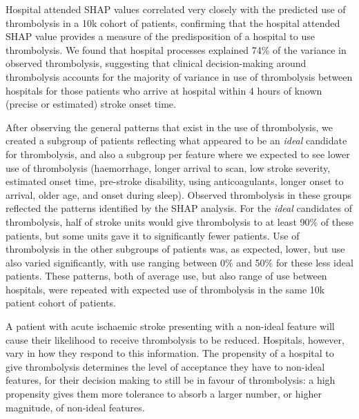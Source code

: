 Hospital attended SHAP values correlated very closely with the predicted use of thrombolysis in a 10k cohort of patients, confirming that the hospital attended SHAP value provides a measure of the predisposition of a hospital to use thrombolysis. We found that hospital processes explained 74\% of the variance in observed thrombolysis, suggesting that clinical decision-making around thrombolysis accounts for the majority of variance in use of thrombolysis between hospitals for those patients who arrive at hospital within 4 hours of known (precise or estimated) stroke onset time. 

After observing the general patterns that exist in the use of thrombolysis, we created a subgroup of patients reflecting what appeared to be an \emph{ideal} candidate for thrombolysis, and also a subgroup per feature where we expected to see lower use of thrombolysis (haemorrhage, longer arrival to scan, low stroke severity, estimated onset time, pre-stroke disability, using anticoagulants, longer onset to arrival, older age, and onset during sleep). Observed thrombolysis in these groups reflected the patterns identified by the SHAP analysis. For the \emph{ideal} candidates of thrombolysis, half of stroke units would give thrombolysis to at least 90\% of these patients, but some units gave it to significantly fewer patients. Use of thrombolysis in the other subgroups of patients was, as expected, lower, but use also varied significantly, with use ranging between 0\% and 50\% for these less ideal patients. These patterns, both of average use, but also range of use between hospitals, were repeated with expected use of thrombolysis in the same 10k patient cohort of patients.

A patient with acute ischaemic stroke presenting with a non-ideal feature will cause their likelihood to receive thrombolysis to be reduced. Hospitals, however, vary in how they respond to this information. The propensity of a hospital to give thrombolysis determines the level of acceptance they have to non-ideal features, for their decision making to still be in favour of thrombolysis: a high propensity gives them more tolerance to absorb a larger number, or higher magnitude, of non-ideal features.

\iffalse
REFERS TO ARTIFICIAL PATIENTS THAT MAY NOT INCLUDE
Another way of showing variation between units was to use artificial patients. After observing the general patterns that exist in the use of thrombolysis, we created an artificial patient representing an \emph{ideal} candidate for thrombolysis that was predicted to receive thrombolysis at almost every hospital. But when we reduced their stroke severity and attributed an estimated onset time the predicted use of thrombolysis dropped to 35\% of hospitals. With the use of SHAP values it is possible to take the next step into understanding this result by peering into how each hospital responds to the characteristics of this patient, to elucidate where hospitals vary in their attitudes to thrombolysis.
\fi

